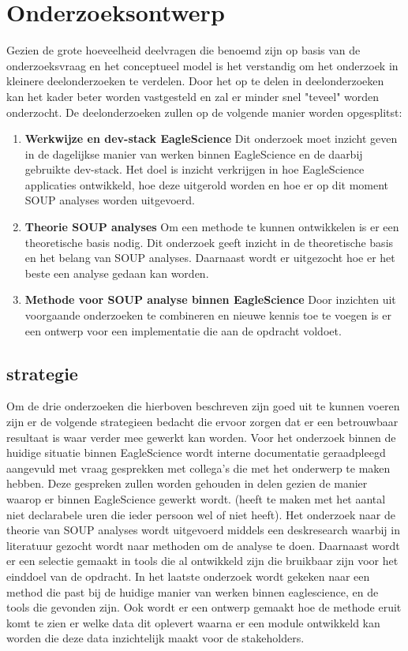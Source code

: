 {\section{Onderzoeksontwerp}\label{sec:onderzoeksontwerp}
Gezien de grote hoeveelheid deelvragen die benoemd zijn op basis van de onderzoeksvraag en het conceptueel model is het verstandig om het onderzoek in kleinere deelonderzoeken te verdelen. Door het op te delen in deelonderzoeken kan het kader beter worden vastgesteld en zal er minder snel "teveel" worden onderzocht. De deelonderzoeken zullen op de volgende manier worden opgesplitst:
\begin{enumerate}
    \item \textbf{Werkwijze en dev-stack EagleScience} Dit onderzoek moet inzicht geven in de dagelijkse manier van werken binnen EagleScience en de daarbij gebruikte dev-stack. Het doel is inzicht verkrijgen in hoe EagleScience applicaties ontwikkeld, hoe deze uitgerold worden en hoe er op dit moment SOUP analyses worden uitgevoerd.
    \item \textbf{Theorie SOUP analyses} Om een methode te kunnen ontwikkelen is er een theoretische basis nodig. Dit onderzoek geeft inzicht in de theoretische basis en het belang van SOUP analyses. Daarnaast wordt er uitgezocht hoe er het beste een analyse gedaan kan worden.
    \item \textbf{Methode voor SOUP analyse binnen EagleScience} Door inzichten uit voorgaande onderzoeken te combineren en nieuwe kennis toe te voegen is er een ontwerp voor een implementatie die aan de opdracht voldoet.
\end{enumerate}

\subsection{strategie}\label{subsec:opstrategie}
Om de drie onderzoeken die hierboven beschreven zijn goed uit te kunnen voeren zijn er de volgende strategieen bedacht die ervoor zorgen dat er een betrouwbaar resultaat is waar verder mee gewerkt kan worden.
Voor het onderzoek binnen de huidige situatie binnen EagleScience wordt interne documentatie geraadpleegd aangevuld met vraag gesprekken met collega's die met het onderwerp te maken hebben. Deze gespreken zullen worden gehouden in delen gezien de manier waarop er binnen EagleScience gewerkt wordt. (heeft te maken met het aantal niet declarabele uren die ieder persoon wel of niet heeft). Het onderzoek naar de theorie van SOUP analyses wordt uitgevoerd middels een deskresearch waarbij in literatuur gezocht wordt naar methoden om de analyse te doen. Daarnaast wordt er een selectie gemaakt in tools die al ontwikkeld zijn die bruikbaar zijn voor het einddoel van de opdracht. In het laatste onderzoek wordt gekeken naar een method die past bij de huidige manier van werken binnen eaglescience, en de tools die gevonden zijn. Ook wordt er een ontwerp gemaakt hoe de methode eruit komt te zien er welke data dit oplevert waarna er een module ontwikkeld kan worden die deze data inzichtelijk maakt voor de stakeholders.


}
